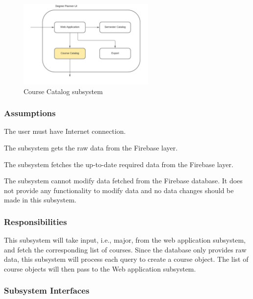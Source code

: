 \begin{figure}[h!]
	\centering
 	\includegraphics[width=0.60\textwidth]{images/CourseCatalog}
 \caption{Course Catalog subsystem}
\end{figure}

\subsubsection{Assumptions}
\begin{itemize}
\begin{item}
The user must have Internet connection.
\end{item}
\begin{item}
The subsystem gets the raw data from the Firebase layer.
\end{item}
\begin{item}
The subsystem fetches the up-to-date required data from the Firebase layer.
\end{item}
\begin{item}
The subsystem cannot modify data fetched from the Firebase database. It does not provide any functionality to modify data and no data changes should be made in this subsystem.
\end{item}
\end{itemize}

\subsubsection{Responsibilities}
This subsystem will take input, i.e., major, from the web application subsystem, and fetch the corresponding list of courses. Since the database only provides raw data, this subsystem will process each query to create a course object. The list of course objects will then pass to the Web application subsystem.

\subsubsection{Subsystem Interfaces}

